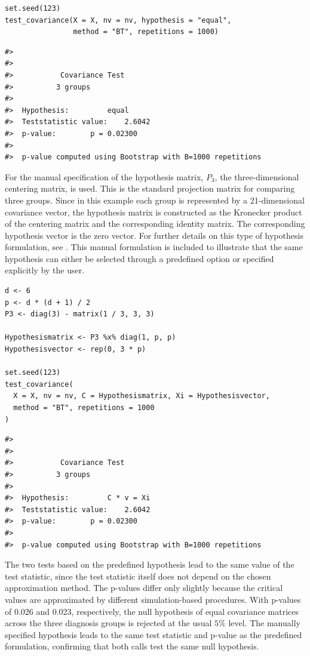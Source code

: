 \begin{verbatim}
set.seed(123)
test_covariance(X = X, nv = nv, hypothesis = "equal",
                method = "BT", repetitions = 1000)
\end{verbatim}

\begin{verbatim}
#> 
#> 
#>           Covariance Test 
#>          3 groups
#> 
#>  Hypothesis:         equal
#>  Teststatistic value:    2.6042
#>  p-value:        p = 0.02300
#>  
#>  p-value computed using Bootstrap with B=1000 repetitions
\end{verbatim}

For the manual specification of the hypothesis matrix, \(P_3\), the
three-dimensional centering matrix, is used. This is the standard projection
matrix for comparing three groups. Since in this example each group is
represented by a 21-dimensional covariance vector, the hypothesis matrix is
constructed as the Kronecker product of the centering matrix and the
corresponding identity matrix. The corresponding hypothesis vector is the zero
vector. For further details on this type of hypothesis formulation, see
\citet{sattler2018}. This manual formulation is included to illustrate that
the same hypothesis can either be selected through a predefined option or
specified explicitly by the user.

\begin{verbatim}
d <- 6
p <- d * (d + 1) / 2
P3 <- diag(3) - matrix(1 / 3, 3, 3)

Hypothesismatrix <- P3 %x% diag(1, p, p)
Hypothesisvector <- rep(0, 3 * p)

set.seed(123)
test_covariance(
  X = X, nv = nv, C = Hypothesismatrix, Xi = Hypothesisvector,
  method = "BT", repetitions = 1000
)
\end{verbatim}

\begin{verbatim}
#> 
#> 
#>           Covariance Test 
#>          3 groups
#> 
#>  Hypothesis:         C * v = Xi
#>  Teststatistic value:    2.6042
#>  p-value:        p = 0.02300
#>  
#>  p-value computed using Bootstrap with B=1000 repetitions
\end{verbatim}

The two tests based on the predefined hypothesis lead to the same value of the
test statistic, since the test statistic itself does not depend on the chosen
approximation method. The p-values differ only slightly because the critical
values are approximated by different simulation-based procedures. With p-values
of 0.026 and 0.023, respectively, the null hypothesis of equal covariance
matrices across the three diagnosis groups is rejected at the usual
\(5\%\) level. The manually specified hypothesis leads to the same test statistic and
p-value as the predefined formulation, confirming that both calls test the same
null hypothesis.

